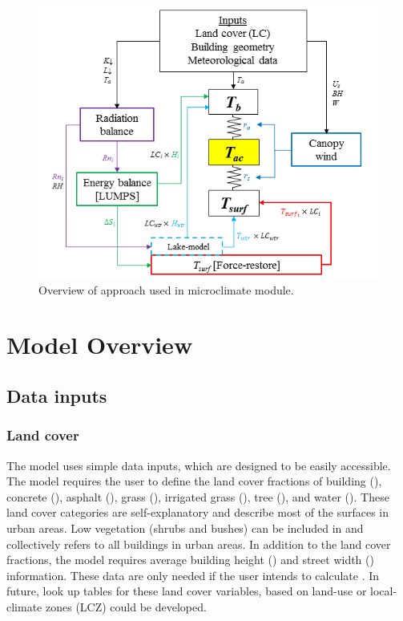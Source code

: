 \documentclass[final,3p,times,authoryear]{elsarticle}
\begin{document}
\begin{figure}[!htbp]
\includegraphics[trim=5mm 0mm 5mm 0mm, clip,scale=1.0]{images/Overview.png}
 \caption{Overview of approach used in  microclimate module.} \label{fig:overview}
\end{figure}

\section{Model Overview}\label{sec:ModelOverview}

\subsection{Data inputs}\label{sec:datainputs}
\subsubsection{Land cover}\label{sec:landcover}

The model uses simple data inputs, which are designed to be easily accessible. The model requires the user to define the land cover fractions of building (), concrete (), asphalt (), grass (), irrigated grass (), tree (), and water (). These land cover categories are self-explanatory and describe most of the surfaces in urban areas. Low vegetation (shrubs and bushes) can be included in  and  collectively refers to all buildings in urban areas.  In addition to the land cover fractions, the model requires average building height () and street width () information. These data are only needed if the user intends to calculate ­. In future, look up tables for these land cover variables, based on land-use or local-climate zones (LCZ) \citep{Stewart2012a} could be developed. 
\end{document}
